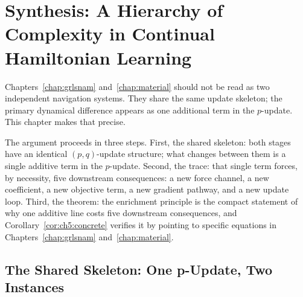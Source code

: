 
\chapter{Synthesis: A Hierarchy of Complexity in Continual Hamiltonian Learning}
\label{chap:hierarchy}

\providecommand{\Ham}{\mathcal{H}}
\providecommand{\Potential}{\mathcal{R}}
\providecommand{\PhaseState}{z}
\providecommand{\Pos}{q}
\providecommand{\Mom}{p}
\providecommand{\Mass}{\mathrm{M}}
\providecommand{\J}{\mathbb{J}}


Chapters~\ref{chap:grlsnam} and~\ref{chap:material} should not be read
as two independent navigation systems.
They share the same update skeleton; the primary dynamical difference
appears as one additional term in the $p$-update.
This chapter makes that precise.

The argument proceeds in three steps.
First, the shared skeleton: both stages have an identical $(p,q)$-update
structure; what changes between them is a single additive term in the
$p$-update.
Second, the trace: that single term forces, by necessity, five downstream
consequences: a new force channel, a new coefficient, a new objective
term, a new gradient pathway, and a new update loop.
Third, the theorem: the enrichment principle is the compact statement
of why one additive line costs five downstream consequences, and
Corollary~\ref{cor:ch5:concrete} verifies it by pointing to specific
equations in Chapters~\ref{chap:grlsnam} and~\ref{chap:material}.

\section{The Shared Skeleton: One p-Update, Two Instances}
\label{sec:ch5:skeleton}

